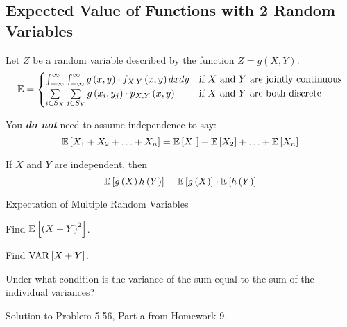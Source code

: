 \subsection{Expected Value of Functions with 2 Random Variables}\label{subsec:Expected Value of Functions with 2 Random Variables}
\begin{definition}\label{def:Expectation of a Function with 2 Random Variables}
  Let $Z$ be a random variable described by the function $Z = g \left( X,Y \right)$.
  \begin{equation}\label{eq:Expected Value of a Function with 2 Random Variables}
    \operatorname{\operatorname{\mathbb{E}}} =
    \begin{cases}
      \int_{-\infty}^{\infty} \int_{-\infty}^{\infty} g \left( x,y \right) \cdot f_{X,Y} \left( x,y \right) dx dy &
      \text{if $X$ and $Y$ are jointly continuous} \\
      \sum\limits_{i \in S_{X}} \sum\limits_{j \in S_{Y}} g \left( x_{i}, y_{j} \right) \cdot p_{X,Y} \left( x,y \right) &
      \text{if $X$ and $Y$ are both discrete} \\
    \end{cases}
  \end{equation}
  \begin{remark}\label{rmk:Expected Value of Sum of Random Variables}
    You \emph{\textbf{do not}} need to assume independence to say:
    \begin{equation}\label{eq:Expected Value of Sum of Random Variables}
      \operatorname{\operatorname{\mathbb{E}}} \left[ X_{1}+X_{2}+\ldots+X_{n} \right] = \operatorname{\operatorname{\mathbb{E}}} \left[ X_{1} \right] + \operatorname{\operatorname{\mathbb{E}}} \left[ X_{2} \right] + \ldots + \operatorname{\operatorname{\mathbb{E}}} \left[ X_{n} \right]
    \end{equation}
  \end{remark}
  \begin{remark}\label{rmk:Expected Value of Product of Random Variables}
    If $X$ and $Y$ are independent, then
    \begin{equation}\label{eq:Expected Value of Product of Random Variables}
      \operatorname{\operatorname{\mathbb{E}}} \left[ g \left( X \right) h \left( Y \right) \right] = \operatorname{\operatorname{\mathbb{E}}} \left[ g \left( X \right) \right] \cdot \operatorname{\operatorname{\mathbb{E}}} \left[ h \left( Y \right) \right]
    \end{equation}
  \end{remark}
\end{definition}
\begin{example}[Problem 5.56]{Expectation of Multiple Random Variables}
  \begin{boldalphlist}
  \item Find $\operatorname{\operatorname{\mathbb{E}}} \left[ \left( X+Y \right)^{2} \right]$.
  \item Find $\operatorname{\operatorname{VAR}} \left[ X+Y \right]$.
  \item Under what condition is the variance of the sum equal to the sum of the individual variances?
  \end{boldalphlist}

  \tcblower

  Solution to Problem 5.56, Part a from Homework 9.
\end{example}

